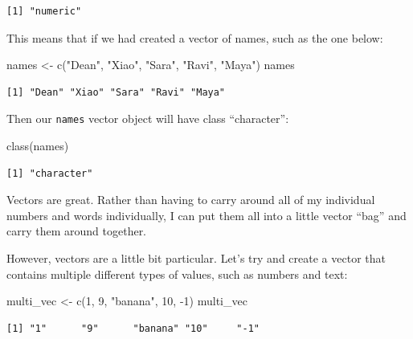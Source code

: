 \documentclass[
  letterpaper,
  DIV=11,
  numbers=noendperiod]{scrreprt}
\newenvironment{Shaded}{\begin{snugshade}}{\end{snugshade}}
\newcommand{\DecValTok}[1]{\textcolor[rgb]{0.68,0.00,0.00}{#1}}
\newcommand{\FunctionTok}[1]{\textcolor[rgb]{0.28,0.35,0.67}{#1}}
\newcommand{\NormalTok}[1]{\textcolor[rgb]{0.00,0.23,0.31}{#1}}
\newcommand{\OtherTok}[1]{\textcolor[rgb]{0.00,0.23,0.31}{#1}}
\newcommand{\SpecialCharTok}[1]{\textcolor[rgb]{0.37,0.37,0.37}{#1}}
\newcommand{\StringTok}[1]{\textcolor[rgb]{0.13,0.47,0.30}{#1}}
\begin{document}
\begin{verbatim}
[1] "numeric"
\end{verbatim}

This means that if we had created a vector of names, such as the one
below:

\begin{Shaded}
\begin{Highlighting}[]
\NormalTok{names }\OtherTok{\textless{}{-}} \FunctionTok{c}\NormalTok{(}\StringTok{"Dean"}\NormalTok{, }\StringTok{"Xiao"}\NormalTok{, }\StringTok{"Sara"}\NormalTok{, }\StringTok{"Ravi"}\NormalTok{, }\StringTok{"Maya"}\NormalTok{)}
\NormalTok{names}
\end{Highlighting}
\end{Shaded}

\begin{verbatim}
[1] "Dean" "Xiao" "Sara" "Ravi" "Maya"
\end{verbatim}

Then our \texttt{names} vector object will have class ``character'':

\begin{Shaded}
\begin{Highlighting}[]
\FunctionTok{class}\NormalTok{(names)}
\end{Highlighting}
\end{Shaded}

\begin{verbatim}
[1] "character"
\end{verbatim}

Vectors are great. Rather than having to carry around all of my
individual numbers and words individually, I can put them all into a
little vector ``bag'' and carry them around together.

However, vectors are a little bit particular. Let's try and create a
vector that contains multiple different types of values, such as numbers
and text:

\begin{Shaded}
\begin{Highlighting}[]
\NormalTok{multi\_vec }\OtherTok{\textless{}{-}} \FunctionTok{c}\NormalTok{(}\DecValTok{1}\NormalTok{, }\DecValTok{9}\NormalTok{, }\StringTok{"banana"}\NormalTok{, }\DecValTok{10}\NormalTok{, }\SpecialCharTok{{-}}\DecValTok{1}\NormalTok{)}
\NormalTok{multi\_vec}
\end{Highlighting}
\end{Shaded}

\begin{verbatim}
[1] "1"      "9"      "banana" "10"     "-1"    
\end{verbatim}
\end{document}
